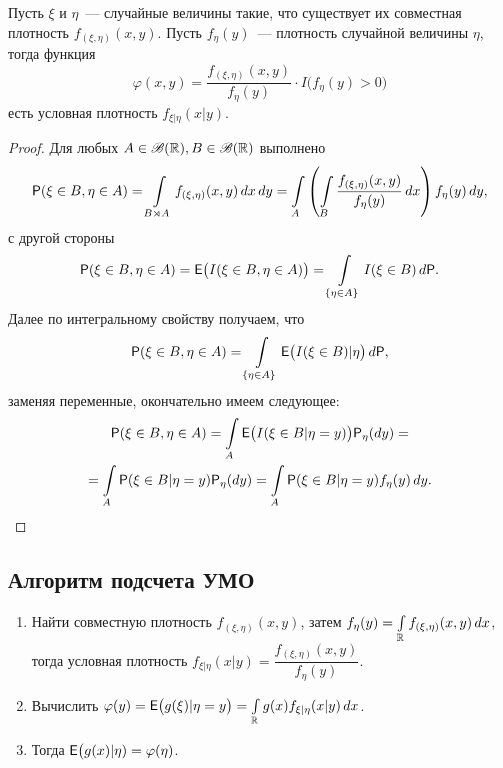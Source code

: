  \begin{theorem}
 	Пусть $\xi$ и $\eta$~--- случайные величины такие, что существует их совместная 
 	плотность $f_{(\xi, \eta)} (x, y)$. Пусть $f_\eta (y)$~--- плотность случайной 
 	величины $\eta$, тогда функция 
 	$$\varphi(x, y) = 
 	\dfrac{f_{(\xi, \eta)} (x, y)}{f_\eta (y)} \cdot I \big(f_\eta(y) > 0 \big)$$ 
 	есть условная плотность $f_{\xi |\eta} (x | y)$.
 	\begin{proof}
 		Для любых $A \in \B(\R), B \in \B(\R)$ выполнено
 		\begin{multline*}
 			\P(\xi \in B, \eta \in A) = 
 			\int\limits_{B \rtimes A} f_{(\xi, \eta)} (x, y) \, dx \, dy = 
 			\int\limits_A \left( \int\limits_B \dfrac{f_{(\xi, \eta)} 
 			(x, y)}{f_\eta(y)} \, dx \right) f_\eta(y) \, dy,
 		\end{multline*}
 		с другой стороны
 		\begin{equation*}
 			\P( \xi \in B, \eta \in A) = \E \big( I (\xi \in B, \eta \in A) \big) = 
 			\int\limits_{\{\eta \in A \}} I(\xi \in B) \, d\P.
 		\end{equation*}
 		Далее по интегральному свойству получаем, что
 		\begin{equation*}
 			\P( \xi \in B, \eta \in A) = 
 			\int\limits_{\{\eta \in A \}} \E  \big( I(\xi \in B) | \eta \big) \, d\P,
 		\end{equation*}
 		заменяя переменные, окончательно имеем следующее:
 		\begin{multline*}
 			\P( \xi \in B, \eta \in A) = 
 			\int\limits_A \E \big( I (\xi \in B | \eta = y) \big) \P_\eta(d y) =\\ 
 			= \int\limits_A \P(\xi \in B | \eta = y) \P_\eta(dy) = 
 			\int\limits_A \P( \xi \in B | \eta = y) f_\eta (y) \, dy.
 		\end{multline*}
 	\end{proof}
 \end{theorem}
 \subsection{Алгоритм подсчета УМО}
 \begin{enumerate}
 	\item {Найти совместную плотность $f_{(\xi, \eta)} (x, y)$, затем 
 		$f_\eta (y) = \int\limits_\R f_{(\xi, \eta)} (x, y) \, dx$, тогда условная
 	 	плотность $f_{ \xi | \eta } (x | y) = \dfrac{f_{(\xi, \eta)} (x, y)}{f_\eta (y)}$.}
 	\item {Вычислить $\varphi(y) = \E \big( g(\xi) | \eta = y \big) = 
 		\int\limits_\R g(x) f_{ \xi | \eta } (x | y) \, dx $.}
 	\item {Тогда $\E  \big( g(x) | \eta) = \varphi(\eta)$.}
 \end{enumerate}
